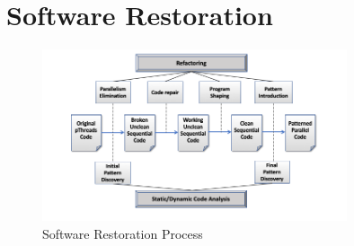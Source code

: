 



\section{Software Restoration}
\label{sec:methodology}

\begin{figure}
	\centering
	\includegraphics[width=0.8\textwidth]{HLPP2020Paper.png}
	\caption{Software Restoration Process}
	\label{fig:SoftRest}
\end{figure}


